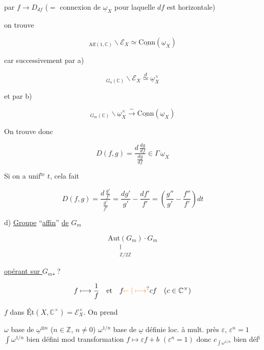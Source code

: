 par $f\longrightarrow D_{df}$ ($=$ connexion de $\underline\omega_X$ pour laquelle  $df$ est horizontale)

on trouve

\[ {}_{\mathrm{Aff}(1,\mathbb C)}\backslash\mathscr E_X\simeq\underline{\mathrm{Conn}}(\underline\omega_X) \]

car successivement par a)

\[ {}_{G_a(\mathbb C)}\backslash\mathscr E_X\overset{d}{\simeq}\underline\omega_X^{\times} \]

et par b)

\[ {}_{G_m(\mathbb C)}\backslash\underline\omega_X^{\times}\xrightarrow{\sim}\underline{\mathrm{Conn}}(\underline\omega_X) \]

On trouve donc

\[ D(f,g)=\frac{d\,\frac{dg}{df}}{\frac{dg}{df}}\in\Gamma\,\underline\omega_X \]

Si on a unif$^{\mathrm{te}}$ $t$, cela fait

\[ D(f,g)=\frac{d\,\frac{g'}{f'}}{\frac{g'}{f'}}=\frac{dg'}{g'}-\frac{df'}{f'}=\left(\frac{g''}{g'}-\frac{f''}{f'}\right)dt \]


d)  \uline{Groupe} ``\uline{affin}'' \uline{de} $G_m$

\[ \underset{\substack{\Vert\\ \mathbb Z/2\mathbb Z}}{\mathrm{Aut}(G_m)}\cdot G_m \]

\uline{opérant sur $G_m$.} ?

\[ f\longmapsto\frac{1}{f}\quad\text{et}\quad f\unsure{\mapstochar\relbar|\longmapsto} c f\quad(c\in\mathbb C^{\times}) \]

$f$ dans $\underline{\mathrm{Ét}}(X,\mathbb C^{\times})=\mathscr E_X^{\times}$. On prend



$\omega$ base de $\underline\omega^{\otimes n}$ ($n\in\mathbb Z$,  $n\ne0$) $\omega^{1/n}$ base de $\underline\omega$ définie loc. à mult. près $\varepsilon$, $\varepsilon^n=1$ $\int\omega^{1/n}$ bien défini mod transformation $f\longmapsto\varepsilon f+b$ $(\varepsilon^{n}=1)$ donc $c_{\int\omega^{1/n}}$ bien déf$^{\mathrm i}$

